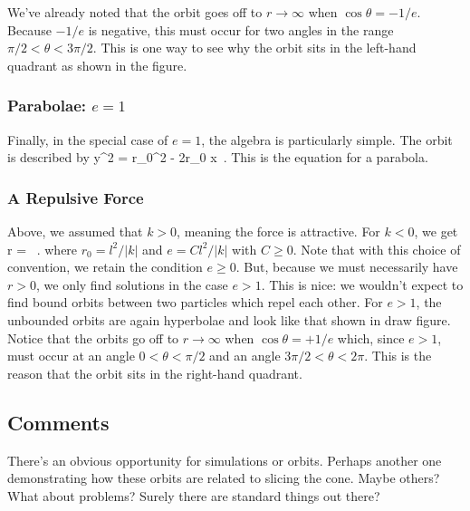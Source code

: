 \para
We've already noted that  the orbit goes off to $r\rightarrow\infty$ when $\cos\theta = -1/e$. Because $-1/e$ is negative, this must occur for two angles in the range $\pi/2< \theta < 3\pi/2$. This is one way to see why the orbit sits in the left-hand quadrant as shown in the figure.

{\co 
\subsubsection*{Parabolae: $e=1$}

Finally, in the special case of $e=1$, the algebra is particularly simple. The orbit is described by 
%
\be y^2 = r_0^2 - 2r_0 x\ .\ee
%
This is the equation for a parabola.}

\subsubsection*{A Repulsive Force}

{\co Above, we assumed that $k>0$, meaning the force is attractive. For $k<0$, we get
%
%
\be r = \ .\ee
%
where $r_0 = l^2/|k|$ and $e=Cl^2/|k|$ with $C\geq 0$. } Note that with this choice of convention, we retain  the condition $e\geq 0$. But, because we must necessarily have $r>0$, we only find solutions in  the case $e>1$. This is nice: we wouldn't expect to find bound orbits between two particles which repel each other. For $e>1$, the unbounded orbits are again hyperbolae and look like that shown in {\cblue draw figure}. Notice that the orbits go off to $r\rightarrow \infty$ when $\cos\theta = +1/e$ which, since $e>1$, must occur at an angle $0<\theta <\pi/2$ and an angle $3\pi/2<\theta<2\pi$.  This is the reason that the orbit sits in the right-hand quadrant. 


\subsection*{Comments}

{\cblue 
There's an obvious opportunity for simulations or orbits. Perhaps another one demonstrating how these orbits are related to slicing the cone. Maybe others? What about problems? Surely there are standard things out there?}

